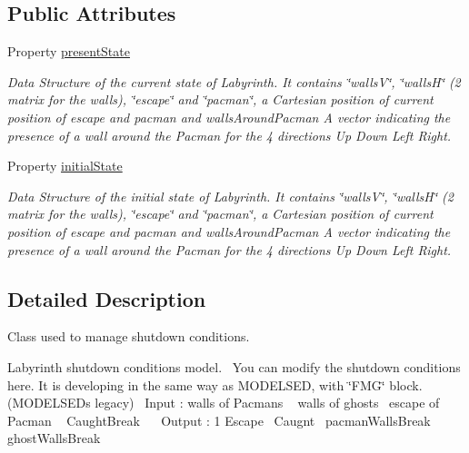 \subsection*{Public Attributes}
\begin{DoxyCompactItemize}
\item 
Property \hyperlink{class_stop_condition_a9624cc7c421a50fa5086b0ebd0cd5fe3}{present\+State}
\begin{DoxyCompactList}\small\item\em Data Structure of the current state of Labyrinth. It contains \char`\"{}walls\+V\char`\"{}, \char`\"{}walls\+H\char`\"{} (2 matrix for the walls), \char`\"{}escape\char`\"{} and \char`\"{}pacman\char`\"{}, a Cartesian position of current position of escape and pacman and \textquotesingle{}walls\+Around\+Pacman\textquotesingle{} A vector indicating the presence of a wall around the Pacman for the 4 directions Up Down Left Right. \end{DoxyCompactList}\item 
Property \hyperlink{class_stop_condition_acd9263acfa96c9138afdf497e55acc24}{initial\+State}
\begin{DoxyCompactList}\small\item\em Data Structure of the initial state of Labyrinth. It contains \char`\"{}walls\+V\char`\"{}, \char`\"{}walls\+H\char`\"{} (2 matrix for the walls), \char`\"{}escape\char`\"{} and \char`\"{}pacman\char`\"{}, a Cartesian position of current position of escape and pacman and \textquotesingle{}walls\+Around\+Pacman\textquotesingle{} A vector indicating the presence of a wall around the Pacman for the 4 directions Up Down Left Right. \end{DoxyCompactList}\end{DoxyCompactItemize}


\subsection{Detailed Description}
Class used to manage shutdown conditions. 

Labyrinth shutdown conditions model.~\newline
 You can modify the shutdown conditions here. It is developing in the same way as M\+O\+D\+E\+L\+S\+ED, with \char`\"{}\+F\+M\+G\char`\"{} block. (M\+O\+D\+E\+L\+S\+ED\textquotesingle{}s legacy)~\newline
 Input \+: walls of Pacman\textquotesingle{}s ~\newline
 walls of ghost\textquotesingle{}s~\newline
 escape of Pacman ~\newline
 Caught\+Break~\newline
~\newline
 Output \+: 1 Escape~ Caugnt~ pacman\+Walls\+Break~ ghost\+Walls\+Break~\newline
 

